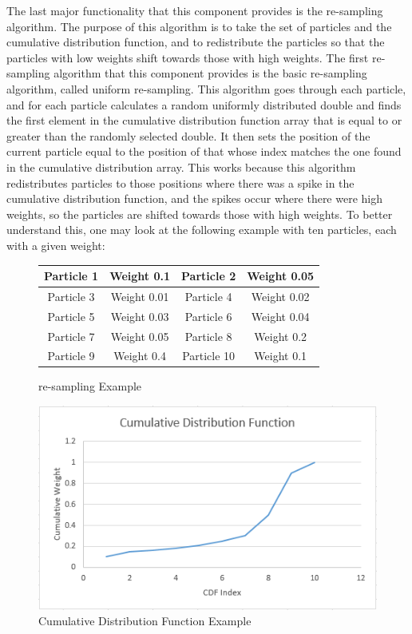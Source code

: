 \documentclass{article}
\begin{document}
The last major functionality that this component provides is the re-sampling algorithm. The purpose of this algorithm is to take the set of particles and the cumulative distribution function, and to redistribute the particles so that the particles with low weights shift towards those with high weights. The first re-sampling algorithm that this component provides is the basic re-sampling algorithm, called uniform re-sampling\citep{ProbRob}. This algorithm goes through each particle, and for each particle calculates a random uniformly distributed double and finds the first element in the cumulative distribution function array that is equal to or greater than the randomly selected double. It then sets the position of the current particle equal to the position of that whose index matches the one found in the cumulative distribution array. This works because this algorithm redistributes particles to those positions where there was a spike in the cumulative distribution function, and the spikes occur where there were high weights, so the particles are shifted towards those with high weights. To better understand this, one may look at the following example with ten particles, each with a given weight:\\

\begin{figure}[h!]
\centering
 \begin{tabular}{|| c | c || c | c ||} 
 \hline
 Particle 1 & Weight 0.1 & Particle 2 & Weight 0.05 \\
 \hline
 Particle 3 & Weight 0.01 & Particle 4 & Weight 0.02 \\ 
 \hline
 Particle 5 & Weight 0.03 & Particle 6 & Weight 0.04 \\
 \hline
 Particle 7 & Weight 0.05 & Particle 8 & Weight 0.2 \\
 \hline
 Particle 9 & Weight 0.4 & Particle 10 & Weight 0.1\\
 \hline
\end{tabular}
\caption{re-sampling Example}
\label{fig:resample_ex}
\end{figure}

\begin{figure}[h!]
\centering
\includegraphics[scale=1.0]{cum_sum.PNG}
\caption{Cumulative Distribution Function Example}
\label{fig:cum_sum}
\end{figure}
\end{document}
